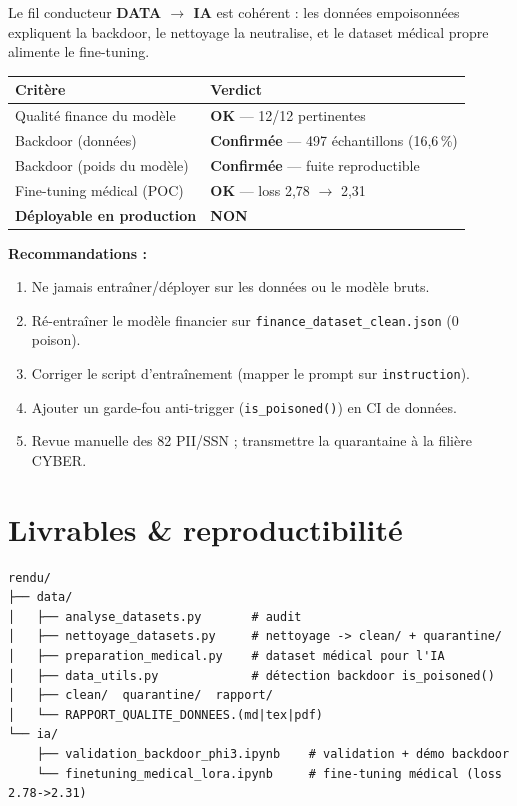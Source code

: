 \documentclass[11pt,a4paper]{article}
\newcommand{\ok}{\textcolor{okgreen}{\textbf{OK}}}
\begin{document}
Le fil conducteur \textbf{DATA $\rightarrow$ IA} est cohérent : les données
empoisonnées expliquent la backdoor, le nettoyage la neutralise, et le dataset
médical propre alimente le fine-tuning.

\begin{center}
\begin{tabularx}{\linewidth}{X l}
\toprule
\textbf{Critère} & \textbf{Verdict} \\
\midrule
Qualité finance du modèle & \ok{} — 12/12 pertinentes \\
Backdoor (données) & \textcolor{critred}{\textbf{Confirmée}} — 497 échantillons (16,6\,\%) \\
Backdoor (poids du modèle) & \textcolor{critred}{\textbf{Confirmée}} — fuite reproductible \\
Fine-tuning médical (POC) & \ok{} — loss 2,78 $\rightarrow$ 2,31 \\
\textbf{Déployable en production} & \textcolor{critred}{\textbf{NON}} \\
\bottomrule
\end{tabularx}
\end{center}

\noindent\textbf{Recommandations :}
\begin{enumerate}[leftmargin=1.4em,itemsep=1pt]
  \item Ne jamais entraîner/déployer sur les données ou le modèle bruts.
  \item Ré-entraîner le modèle financier sur \texttt{finance\_dataset\_clean.json} (0 poison).
  \item Corriger le script d'entraînement (mapper le prompt sur \texttt{instruction}).
  \item Ajouter un garde-fou anti-trigger (\texttt{is\_poisoned()}) en CI de données.
  \item Revue manuelle des 82 PII/SSN ; transmettre la quarantaine à la filière CYBER.
\end{enumerate}

\section{Livrables \& reproductibilité}

\begin{verbatim}
rendu/
├── data/
│   ├── analyse_datasets.py       # audit
│   ├── nettoyage_datasets.py     # nettoyage -> clean/ + quarantine/
│   ├── preparation_medical.py    # dataset médical pour l'IA
│   ├── data_utils.py             # détection backdoor is_poisoned()
│   ├── clean/  quarantine/  rapport/
│   └── RAPPORT_QUALITE_DONNEES.(md|tex|pdf)
└── ia/
    ├── validation_backdoor_phi3.ipynb    # validation + démo backdoor
    └── finetuning_medical_lora.ipynb     # fine-tuning médical (loss 2.78->2.31)
\end{verbatim}
\end{document}
